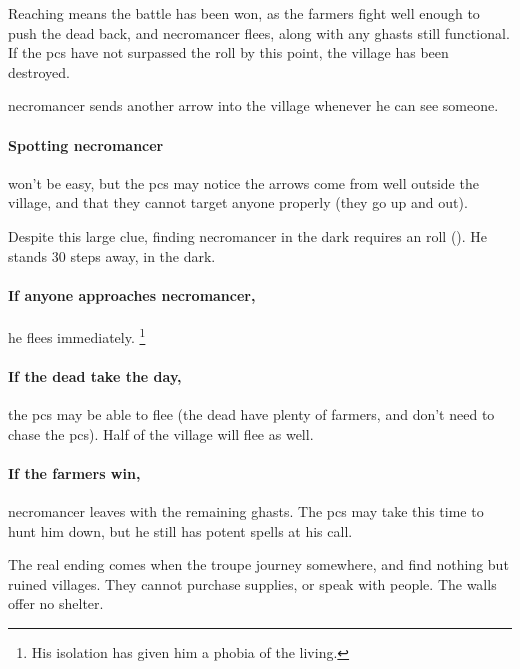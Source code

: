 Reaching \tn[16] means the battle has been won, as the farmers fight well enough to push the dead back, and \gls{necromancer} flees, along with any ghasts still functional.
If the \glspl{pc} have not surpassed the roll by this point, the \gls{village} has been destroyed.

\Gls{necromancer} sends another arrow into the \gls{village} whenever he can see someone.

\paragraph{Spotting \gls{necromancer}}
won't be easy, but the \glspl{pc} may notice the arrows come from well outside the \gls{village}, and that they cannot target anyone properly (they go up and out).

Despite this large clue, finding \gls{necromancer} in the dark requires an  roll (\tn[12]).
He stands 30 \glspl{step} away, in the dark.

\paragraph{If anyone approaches \gls{necromancer},}
he flees immediately.%
\footnote{His isolation has given him a phobia of the living.}

\paragraph{If the dead take the day,}
the \glspl{pc} may be able to flee (the dead have plenty of farmers, and don't need to chase the \glspl{pc}).
Half of the \gls{village} will flee as well.

\paragraph{If the farmers win,}
\gls{necromancer} leaves with the remaining ghasts.
The \glspl{pc} may take this time to hunt him down, but he still has potent spells at his call.

\thenecromancer

\showStdSpells[
  \deathStormSpell
]




\bigLine

The real ending comes when the troupe journey somewhere, and find nothing but ruined \glspl{village}.
They cannot purchase supplies, or speak with people.
The walls offer no shelter.
